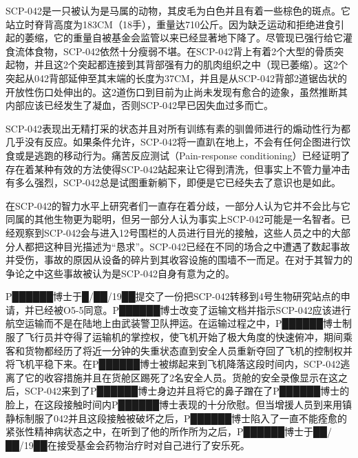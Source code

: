 SCP-042是一只被认为是马属的动物，其皮毛为白色并且有着一些棕色的斑点。它站立时脊背高度为183CM（18手），重量达710公斤。因为缺乏运动和拒绝进食引起的萎缩，它的重量自被基金会监管以来已经显著地下降了。尽管现已强行给它灌食流体食物，SCP-042依然十分瘦弱不堪。在SCP-042背上有着2个大型的骨质突起物，并且这2个突起都连接到其背部强有力的肌肉组织之中（现已萎缩）。这2个突起从042背部延伸至其末端的长度为37CM，并且是从SCP-042背部2道锯齿状的开放性伤口处伸出的。这2道伤口到目前为止尚未发现有愈合的迹象，虽然推断其内部应该已经发生了凝血，否则SCP-042早已因失血过多而亡。

SCP-042表现出无精打采的状态并且对所有训练有素的驯兽师进行的煽动性行为都几乎没有反应。如果条件允许，SCP-042将一直趴在地上，不会有任何企图进行饮食或是逃跑的移动行为。痛苦反应测试（Pain-response conditioning）已经证明了存在着某种有效的方法使得SCP-042站起来让它得到清洗，但事实上不管力量冲击有多么强烈，SCP-042总是试图重新躺下，即便是它已经失去了意识也是如此。

在SCP-042的智力水平上研究者们一直存在着分歧，一部分人认为它并不会比与它同属的其他生物更为聪明，但另一部分人认为事实上SCP-042可能是一名智者。已经观察到SCP-042会与进入12号围栏的人员进行目光的接触，这些人员之中的大部分人都把这种目光描述为“恳求”。SCP-042已经在不同的场合之中遭遇了数起事故并受伤，事故的原因从设备的碎片到其收容设施的围墙不一而足。在对于其智力的争论之中这些事故被认为是SCP-042自身有意为之的。

P██████博士于█\slash ██\slash 19██提交了一份把SCP-042转移到4号生物研究站点的申请，并已经被O5-5同意。P██████博士改变了运输文档并指示SCP-042应该进行航空运输而不是在陆地上由武装警卫队押运。在运输过程之中，P██████博士制服了飞行员并夺得了运输机的掌控权，使飞机开始了极大角度的快速俯冲，期间乘客和货物都经历了将近一分钟的失重状态直到安全人员重新夺回了飞机的控制权并将飞机平稳下来。在P██████博士被绑起来到飞机降落这段时间内，SCP-042逃离了它的收容措施并且在货舱区踢死了2名安全人员。货舱的安全录像显示在这之后，SCP-042来到了P██████博士身边并且将它的鼻子蹭在了P██████博士的脸上，在这段接触时间内P██████博士表现的十分欣慰。但当增援人员到来用镇静标制服了042并且这段接触被破坏之后，P██████博士陷入了一直不能痊愈的紧张性精神病状态之中，在听到了他的所作所为之后，P██████博士于██\slash ██\slash 19██在接受基金会药物治疗时对自己进行了安乐死。
